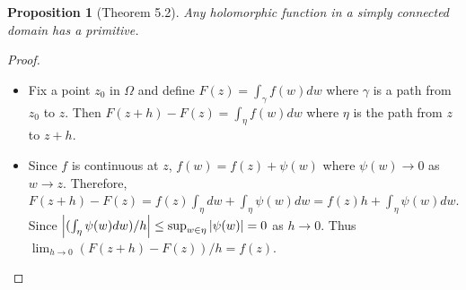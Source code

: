 \documentclass[12pt, psamsfonts]{amsart}
\newtheorem{prop}[thm]{Proposition}
\theoremstyle{definition}
\theoremstyle{remark}
\numberwithin{equation}{section}
\begin{document}
\begin{prop}[Theorem 5.2]
  Any holomorphic function in a simply connected domain has a primitive.
\end{prop}

\begin{proof}
  $ $
  \begin{itemize}
    \item
      Fix a point $z_0$ in $\Omega$ and define $F(z) = \int_{\gamma}f(w)dw$ where $\gamma$ is a path from $z_0$ to $z$.
      Then $F(z + h) - F(z) = \int_{\eta} f(w)dw$ where $\eta$ is the path from $z$ to $z + h$.
    \item
      Since $f$ is continuous at $z$, $f(w) = f(z) + \psi(w)$ where $\psi(w) \rightarrow 0$ as $w \rightarrow z$.
      Therefore, $F(z + h) - F(z) = f(z)\int_{\eta}dw + \int_{\eta} \psi(w)dw = f(z)h + \int_{\eta} \psi(w)dw$.
      Since $\abs{(\int_{\eta} \psi(w) dw) / h} \leq \sup_{w \in \eta} \abs{\psi(w)} = 0$ as $h \rightarrow 0$.
      Thus $\lim_{h \rightarrow 0} (F(z + h) - F(z)) / h = f(z)$.
  \end{itemize}
\end{proof}
\end{document}
